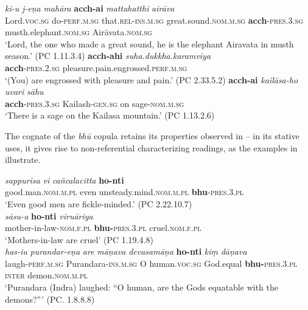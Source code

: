 \documentclass[output=paper,hidelinks]{langscibook}
\begin{document}
\begin{exe}
\begin{xlist}
\begin{xlist}
\begin{exe}
\begin{exe}
\begin{exe}
\begin{exe}
\begin{xlist}
\begin{exe}
\begin{xlist}
\begin{exe}
\begin{xlist}
\ea \label{cop1exmia}
 \ea
{} \emph{ki-u} \emph{j-eṇa} \emph{mahāra} \textbf{acch-ai} \emph{mattahatthi} \emph{airāva}\\
 Lord.\textsc{voc.sg} do-\textsc{perf.m.sg} that.\textsc{rel-ins.m.sg} great.sound.\textsc{nom.m.sg} \textbf{acch}-\textsc{pres.3.sg} musth.elephant.\textsc{nom.sg} Airāvata.\textsc{nom.sg}\\
\glt `Lord, the one who made a great sound, he is the elephant Airavata in musth season.' (PC 1.11.3.4)
\ex
\gll \textbf{acch-ahi} \emph{suha.dukkha.karamviya}\\
\textbf{acch}-\textsc{pres.2.sg} pleasure.pain.engrossed.\textsc{perf.m.sg}\\
\glt `(You) are engrossed with pleasure and pain.' (PC 2.33.5.2)
\ex
\gll \textbf{acch-ai} \emph{kailāsa-ho} \emph{uvari} \emph{sāhu}\\
\textbf{acch}-\textsc{pres.3.sg} Kailash-\textsc{gen.sg} on sage-\textsc{nom.m.sg}\\
\glt `There is a sage on the Kailasa mountain.' (PC 1.13.2.6)
\z
\z

The cognate of the \emph{bh\={u}} copula retains its properties observed in  -- in its stative uses, it gives rise to non-referential characterizing readings, as the examples in  illustrate.

\ea \label{cop2exmia}
\ea
\gll \emph{sappurisa} \emph{vi} \emph{ca\~{n}calacitta} \textbf{ho-nti}\\
good.man.\textsc{nom.m.pl} even unsteady.mind.\textsc{nom.m.pl} \textbf{bhu}\textsc{-pres.3.pl}\\
\glt `Even good men are fickle-minded.' (PC 2.22.10.7)\\
\ex
\gll \emph{sāsu-a} \textbf{ho-nti} \emph{viruāriya}\\
mother-in-law-\textsc{nom.f.pl} \textbf{bhu-}\textsc{pres.3.pl} cruel.\textsc{nom.f.pl}\\
\glt `Mothers-in-law are cruel' (PC 1.19.4.8)\\
\ex
\gll \emph{has-iu} \emph{purandar-eṇa} \emph{are} \emph{māṇava} \emph{devasamāṇa} \textbf{ho-nti} \emph{ki\d{m}} \emph{dāṇava}\\
 laugh-\textsc{perf.m.sg} Purandara-\textsc{ins.m.sg} O human.\textsc{voc.sg} God.equal \textbf{bhu-}\textsc{pres.3.pl} \textsc{inter} demon.\textsc{nom.m.pl}\\
\glt `Purandara (Indra) laughed: ``O human, are the Gods equatable with the demons?{''}' (PC. 1.8.8.8)
\z
\z


\end{xlist}
\end{exe}
\end{xlist}
\end{exe}
\end{xlist}
\end{exe}
\end{exe}
\end{exe}
\end{exe}
\end{xlist}
\end{xlist}
\end{exe}
\end{document}
